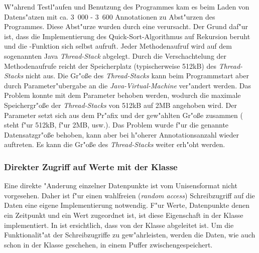 W"ahrend Testl"aufen und Benutzung des Programmes kam es beim Laden von Datens"atzen mit ca. \unit{3.000} - \unit{3.600} Annotationen zu Abst"urzen des Programmes.
Diese Abst"urze wurden durch eine  verursacht.
Der Grund daf"ur ist, dass die Implementierung des Quick-Sort-Algorithmus auf Rekursion beruht und die -Funktion sich selbst aufruft.
Jeder Methodenaufruf wird auf dem sogenannten Java \emph{Thread-Stack} abgelegt.
Durch die Verschachtelung der Methodenaufrufe reicht der Speicherplatz (typischerweise \unit{512}{kB}) des \emph{Thread-Stacks} nicht aus.
Die Gr"o{\ss}e des \emph{Thread-Stacks} kann beim Programmstart aber durch Parameter"ubergabe an die \emph{Java-Virtual-Machine} ver"andert werden.
Das Problem konnte mit dem Parameter  behoben werden, wodurch die maximale Speichergr"o{\ss}e der \emph{Thread-Stacks} von \unit{512}{kB} auf \unit{2}{MB} angehoben wird.
Der Parameter setzt sich aus dem Pr"afix  und der gew"ahlten Gr"o{\ss}e zusammen ( steht f"ur \unit{512}{kB},  f"ur \unit{2}{MB}, usw.).
Das Problem wurde f"ur die genannte Datensatzgr"o{\ss}e behoben, kann aber bei h"oherer Annotationsanzahl wieder auftreten.
Es kann die Gr"o{\ss}e des \emph{Thread-Stacks} weiter erh"oht werden.


\subsubsection{Direkter Zugriff auf Werte mit der Klasse }

Eine direkte "Anderung einzelner Datenpunkte ist vom Unisensformat nicht vorgesehen.
Daher ist f"ur einen wahlfreien (\emph{random access}) Schreibzugriff auf die Daten eine eigene Implementierung notwendig.
F"ur Werte, Datenpunkte denen ein Zeitpunkt und ein Wert zugeordnet ist, ist diese Eigenschaft in der Klasse  implementiert.
In  ist ersichtlich, dass  von der Klasse  abgeleitet ist.
Um die Funktionalit"at der Schreibzugriffe zu gew"ahrleisten, werden die Daten, wie auch schon in der Klasse  geschehen, in einem Puffer  zwischengespeichert.

